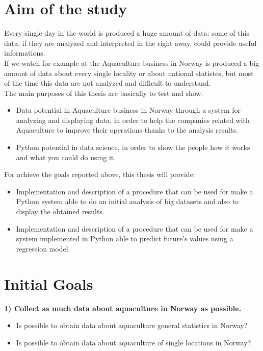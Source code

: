 


\section{Aim of the study}
Every single day in the world is produced a huge amount of data: some of this data, if they are analyzed and interpreted in the right away, could provide useful informations.\\
If we watch for example at the Aquaculture business in Norway is produced a big amount of data about every single locality or about national statistcs, but most of the time this data are not analyzed and difficult to understand.\\
The main purposes of this thesis are basically to test and show:
\begin{itemize} 
 \item 	Data potential in Aquaculture business in Norway through a system for analyzing and displaying data, in order to help the companies related with Aquaculture to improve their operations thanks to the analysis results.
 \item 	Python potential in data science, in order to show the people how it works and what you could do using it.
 \end{itemize}
For achieve the goals reported above, this thesis will provide:
\begin{itemize} 
 \item 	Implementation and description of a procedure that can be used for make a Python system able to do an initial analysis of  big datasets and also to display the obtained results.
 \item Implementation and description of a procedure that can be used for make a system implemented in Python able to predict future’s values using a regression model.
 
 \end{itemize}

\newpage
\section{Initial Goals}

\textbf{1) Collect as much data about aquaculture in Norway as possible.}
\vspace{-5mm}
\begin{itemize}
 \setlength{\itemsep}{-5pt}
  \item Is possible to obtain data about aquaculture general statistics in Norway?
  \item Is possible to obtain data about aquaculture of single locations in Norway?
\end{itemize}

